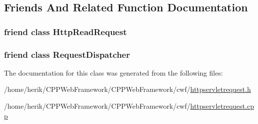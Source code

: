 \subsection{Friends And Related Function Documentation}
\hypertarget{class_c_w_f_1_1_http_servlet_request_a4d54f5003e07e218070a449c22a52c7c}{
\subsubsection[{Http\+Read\+Request}]{\setlength{\rightskip}{0pt plus 5cm}friend class {\bf Http\+Read\+Request}\hspace{0.3cm}{\ttfamily [friend]}}}\label{class_c_w_f_1_1_http_servlet_request_a4d54f5003e07e218070a449c22a52c7c}
\hypertarget{class_c_w_f_1_1_http_servlet_request_ae82f2dbbf52e70637edba766141fd80e}{
\subsubsection[{Request\+Dispatcher}]{\setlength{\rightskip}{0pt plus 5cm}friend class {\bf Request\+Dispatcher}\hspace{0.3cm}{\ttfamily [friend]}}}\label{class_c_w_f_1_1_http_servlet_request_ae82f2dbbf52e70637edba766141fd80e}


The documentation for this class was generated from the following files\+:\begin{DoxyCompactItemize}
\item 
/home/herik/\+C\+P\+P\+Web\+Framework/\+C\+P\+P\+Web\+Framework/cwf/\hyperlink{httpservletrequest_8h}{httpservletrequest.\+h}\item 
/home/herik/\+C\+P\+P\+Web\+Framework/\+C\+P\+P\+Web\+Framework/cwf/\hyperlink{httpservletrequest_8cpp}{httpservletrequest.\+cpp}\end{DoxyCompactItemize}
